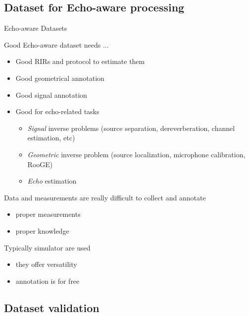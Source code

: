 \subsection{Dataset for Echo-aware processing}

\begin{frame}{Echo-aware Datasets}

    \begin{block}{Good Echo-aware dataset needs ...}
        \begin{itemize}
            \item Good RIRs and protocol to estimate them
            \item Good geometrical annotation
            \item Good signal annotation
            \item Good for echo-related tasks
            \begin{itemize}
                \item \textit{Signal} inverse problems (source separation, dereverberation, channel estimation, etc)
                \item \textit{Geometric} inverse problem (source localization, microphone calibration, RooGE)
                \item \textit{Echo} estimation
            \end{itemize}
        \end{itemize}
    \end{block}

    \begin{block}{Data and measurements are really difficult to collect and annotate}
        \begin{itemize}
            \item proper measurements
            \item proper knowledge
        \end{itemize}

    \end{block}

    \vfill

    Typically simulator are used
    \begin{itemize}
        \item they offer versatility
        \item annotation is for free
    \end{itemize}


\end{frame}


\subsection{Dataset validation}

